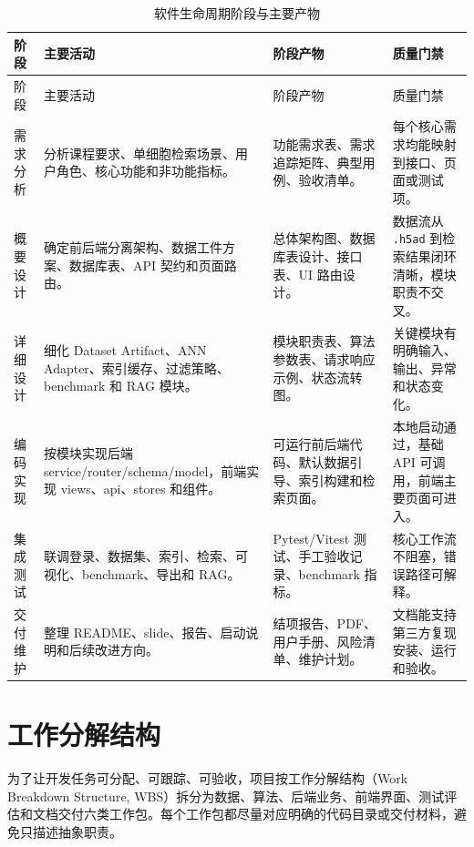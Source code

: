 \documentclass[UTF8,a4paper,12pt]{ctexrep}
\begin{document}
\begin{longtable}{@{}L{0.13\textwidth}L{0.27\textwidth}L{0.28\textwidth}L{0.22\textwidth}@{}}
  \caption{软件生命周期阶段与主要产物} \\
  \toprule
  阶段 & 主要活动 & 阶段产物 & 质量门禁 \\
  \midrule
  \endfirsthead
  \toprule
  阶段 & 主要活动 & 阶段产物 & 质量门禁 \\
  \midrule
  \endhead
  需求分析 & 分析课程要求、单细胞检索场景、用户角色、核心功能和非功能指标。 & 功能需求表、需求追踪矩阵、典型用例、验收清单。 & 每个核心需求均能映射到接口、页面或测试项。 \\
  概要设计 & 确定前后端分离架构、数据工件方案、数据库表、API 契约和页面路由。 & 总体架构图、数据库表设计、接口表、UI 路由设计。 & 数据流从 \texttt{.h5ad} 到检索结果闭环清晰，模块职责不交叉。 \\
  详细设计 & 细化 Dataset Artifact、ANN Adapter、索引缓存、过滤策略、benchmark 和 RAG 模块。 & 模块职责表、算法参数表、请求响应示例、状态流转图。 & 关键模块有明确输入、输出、异常和状态变化。 \\
  编码实现 & 按模块实现后端 service/router/schema/model，前端实现 views、api、stores 和组件。 & 可运行前后端代码、默认数据引导、索引构建和检索页面。 & 本地启动通过，基础 API 可调用，前端主要页面可进入。 \\
  集成测试 & 联调登录、数据集、索引、检索、可视化、benchmark、导出和 RAG。 & Pytest/Vitest 测试、手工验收记录、benchmark 指标。 & 核心工作流不阻塞，错误路径可解释。 \\
  交付维护 & 整理 README、slide、报告、启动说明和后续改进方向。 & 结项报告、PDF、用户手册、风险清单、维护计划。 & 文档能支持第三方复现安装、运行和验收。 \\
  \bottomrule
\end{longtable}

\section{工作分解结构}

为了让开发任务可分配、可跟踪、可验收，项目按工作分解结构（Work Breakdown Structure, WBS）拆分为数据、算法、后端业务、前端界面、测试评估和文档交付六类工作包。每个工作包都尽量对应明确的代码目录或交付材料，避免只描述抽象职责。
\end{document}
